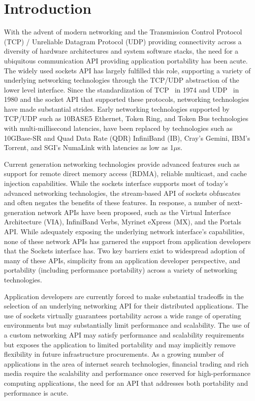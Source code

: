 \section{Introduction}

With the advent of modern networking and the Transmission Control
Protocol (TCP) / Unreliable Datagram Protocol (UDP) providing
connectivity across a diversity of hardware architectures and system
software stacks, the need for a ubiquitous communication API providing
application portability has been acute. The widely used sockets API
has largely fulfilled this role, supporting a variety of underlying
networking technologies through the TCP/UDP abstraction of the lower
level interface. Since the standardization of TCP~\cite{tcp-standard}
in 1974 and UDP~\cite{udp-standard} in 1980 and the socket API that
supported these protocols, networking technologies have made
substantial strides. Early networking technologies supported by
TCP/UDP such as 10BASE5 Ethernet, Token Ring, and Token Bus
technologies with multi-millisecond latencies, have been replaced by
technologies such as 10GBase-SR and Quad Data Rate (QDR) InfiniBand
(IB), Cray's Gemini, IBM's Torrent, and SGI's NumaLink with latencies
as low as 1$\mu$s.

Current generation networking technologies provide advanced features
such as support for remote direct memory access (RDMA), reliable
multicast, and cache injection capabilities. While the sockets
interface supports most of today's advanced networking technologies,
the stream-based API of sockets obfuscates and often negates the
benefits of these features. In response, a number of next-generation
network APIs have been proposed, such as the Virtual Interface
Architecture (VIA), InfiniBand Verbs, Myrinet eXpress (MX), and the
Portals API. While adequately exposing the underlying network
interface's capabilities, none of these network APIs has garnered the
support from application developers that the Sockets interface has. Two
key barriers exist to widespread adoption of many of these APIs,
simplicity from an application developer perspective, and portability
(including performance portability) across a variety of networking
technologies.

Application developers are currently forced to make substantial
tradeoffs in the selection of an underlying networking API for their
distributed applications. The use of sockets virtually guarantees
portability across a wide range of operating environments but may
substantially limit performance and scalability. The use of a custom
networking API may satisfy performance and scalability requirements
but exposes the application to limited portability and may implicitly
remove flexibility in future infrastructure procurements. As a growing
number of applications in the area of internet search technologies,
financial trading and rich media require the scalability and
performance once reserved for high-performance computing applications,
the need for an API that addresses both portability and performance is
acute.

